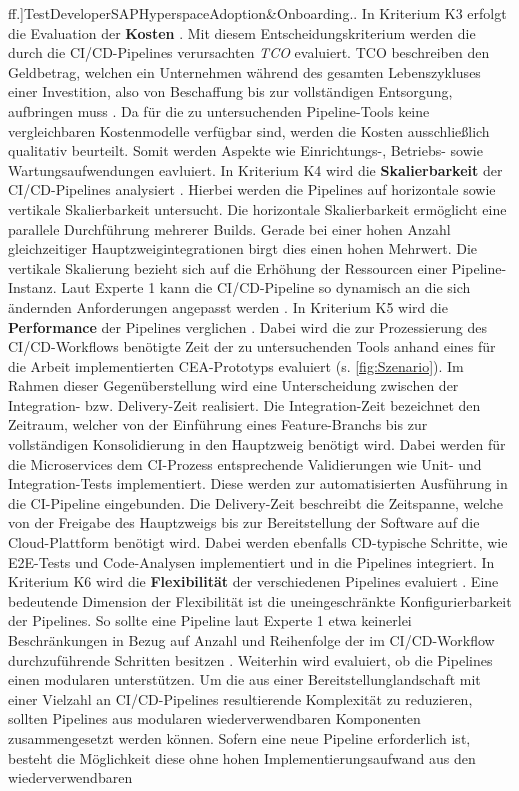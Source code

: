 ff.]{TestDeveloperSAPHyperspaceAdoption&Onboarding.}. In Kriterium K3 erfolgt die Evaluation der \textbf{Kosten} \cite[Z. 43]{ProductManagerSAPHyperspaceCICD.}. Mit diesem Entscheidungskriterium werden die durch die CI/CD-Pipelines verursachten \textit{\ac{TCO}} evaluiert. TCO beschreiben den Geldbetrag, welchen ein Unternehmen während des gesamten Lebenszykluses einer Investition, also von Beschaffung bis zur vollständigen Entsorgung, aufbringen muss \cite[3]{Ellram.1993}. Da für die zu untersuchenden Pipeline-Tools keine vergleichbaren Kostenmodelle verfügbar sind, werden die Kosten ausschließlich qualitativ beurteilt. Somit werden Aspekte wie Einrichtungs-, Betriebs- sowie Wartungsaufwendungen eavluiert. In Kriterium K4 wird die \textbf{Skalierbarkeit} der CI/CD-Pipelines analysiert \cite[Z. 69 ff.]{ProductOwnerSAPBTPProd&Infra.}. Hierbei werden die Pipelines auf horizontale sowie vertikale Skalierbarkeit untersucht. Die horizontale Skalierbarkeit ermöglicht eine parallele Durchführung mehrerer Builds. Gerade bei einer hohen Anzahl gleichzeitiger Hauptzweigintegrationen birgt dies einen hohen Mehrwert. Die vertikale Skalierung bezieht sich auf die Erhöhung der Ressourcen einer Pipeline-Instanz. Laut Experte 1 kann die CI/CD-Pipeline so dynamisch an die sich ändernden Anforderungen angepasst werden \cite[Z. 70 ff.]{ProductOwnerSAPBTPProd&Infra.}. In Kriterium K5 wird die \textbf{Performance} der Pipelines verglichen \cite[Z. 36 ff.]{ProductManagerSAPHyperspaceCICD.}. Dabei wird die zur Prozessierung des CI/CD-Workflows benötigte Zeit der zu untersuchenden Tools anhand eines für die Arbeit implementierten CEA-Prototyps evaluiert (s. \ref{fig:Szenario}). Im Rahmen dieser Gegenüberstellung wird eine Unterscheidung zwischen der Integration- bzw. Delivery-Zeit realisiert. Die Integration-Zeit bezeichnet den Zeitraum, welcher von der Einführung eines Feature-Branchs bis zur vollständigen Konsolidierung in den Hauptzweig benötigt wird. Dabei werden für die Microservices dem CI-Prozess entsprechende Validierungen wie Unit- und Integration-Tests implementiert. Diese werden zur automatisierten Ausführung in die CI-Pipeline eingebunden. Die Delivery-Zeit beschreibt die Zeitspanne, welche von der Freigabe des Hauptzweigs bis zur Bereitstellung der Software auf die Cloud-Plattform benötigt wird. Dabei werden ebenfalls CD-typische Schritte, wie E2E-Tests und Code-Analysen implementiert und in die Pipelines integriert. In Kriterium K6 wird die \textbf{Flexibilität} der verschiedenen Pipelines evaluiert \cite[Z. 65 ff.]{ProductOwnerSAPBTPProd&Infra.}. Eine bedeutende Dimension der Flexibilität ist die uneingeschränkte Konfigurierbarkeit der Pipelines. So sollte eine Pipeline laut Experte 1 etwa keinerlei Beschränkungen in Bezug auf Anzahl und Reihenfolge der im CI/CD-Workflow durchzuführende Schritten besitzen \cite[Z. 65 ff.]{ProductOwnerSAPBTPProd&Infra.}. Weiterhin wird evaluiert, ob die Pipelines einen modularen unterstützen. Um die aus einer Bereitstellunglandschaft mit einer Vielzahl an CI/CD-Pipelines resultierende Komplexität zu reduzieren, sollten Pipelines aus modularen wiederverwendbaren Komponenten zusammengesetzt werden können. Sofern eine neue Pipeline erforderlich ist, besteht die Möglichkeit diese ohne hohen Implementierungsaufwand aus den wiederverwendbaren 